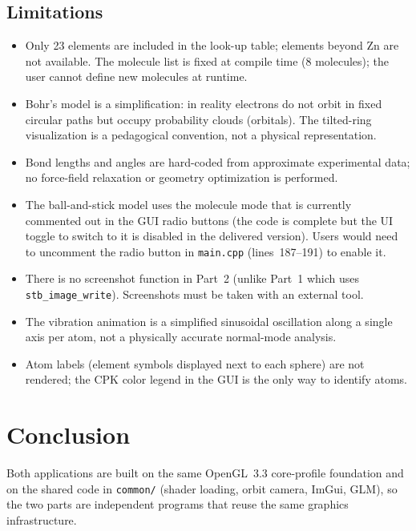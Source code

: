 \documentclass[a4paper, 11pt]{article}
\newcommand{\code}[1]{\texttt{#1}}
\begin{document}
\subsection{Limitations}\label{sec:lim2}

\begin{itemize}
  \item Only 23 elements are included in the look-up table; elements beyond Zn are not available. The molecule list is fixed at compile time (8 molecules); the user cannot define new molecules at runtime.
  \item Bohr's model is a simplification: in reality electrons do not orbit in fixed circular paths but occupy probability clouds (orbitals). The tilted-ring visualization is a pedagogical convention, not a physical representation.
  \item Bond lengths and angles are hard-coded from approximate experimental data; no force-field relaxation or geometry optimization is performed.
  \item The ball-and-stick model uses the molecule mode that is currently commented out in the GUI radio buttons (the code is complete but the UI toggle to switch to it is disabled in the delivered version). Users would need to uncomment the radio button in \code{main.cpp} (lines~187--191) to enable it.
  \item There is no screenshot function in Part~2 (unlike Part~1 which uses \code{stb\_image\_write}). Screenshots must be taken with an external tool.
  \item The vibration animation is a simplified sinusoidal oscillation along a single axis per atom, not a physically accurate normal-mode analysis.
  \item Atom labels (element symbols displayed next to each sphere) are not rendered; the CPK color legend in the GUI is the only way to identify atoms.
\end{itemize}


\section{Conclusion}\label{sec:conclusion}

Both applications are built on the same OpenGL~3.3 core-profile foundation and on the shared code in \code{common/} (shader loading, orbit camera, ImGui, GLM), so
the two parts are independent programs that reuse the same graphics infrastructure.
\end{document}
